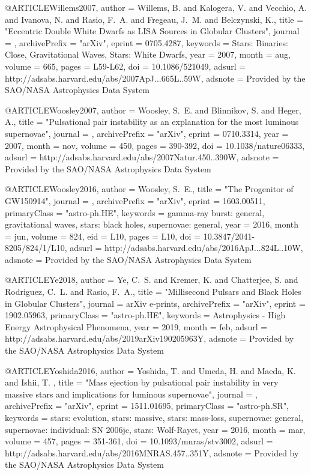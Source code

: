 \documentclass[twocolumn,tighten]{aastex63}
\begin{document}
{{{{{{@ARTICLE{Willems2007,
   author = {{Willems}, B. and {Kalogera}, V. and {Vecchio}, A. and {Ivanova}, N. and 
	{Rasio}, F.~A. and {Fregeau}, J.~M. and {Belczynski}, K.},
    title = "{Eccentric Double White Dwarfs as LISA Sources in Globular Clusters}",
  journal = {\apjl},
archivePrefix = "arXiv",
   eprint = {0705.4287},
 keywords = {Stars: Binaries: Close, Gravitational Waves, Stars: White Dwarfs},
     year = 2007,
    month = aug,
   volume = 665,
    pages = {L59-L62},
      doi = {10.1086/521049},
   adsurl = {http://adsabs.harvard.edu/abs/2007ApJ...665L..59W},
  adsnote = {Provided by the SAO/NASA Astrophysics Data System}
}

@ARTICLE{Woosley2007,
   author = {{Woosley}, S.~E. and {Blinnikov}, S. and {Heger}, A.},
    title = "{Pulsational pair instability as an explanation for the most luminous supernovae}",
  journal = {\nat},
archivePrefix = "arXiv",
   eprint = {0710.3314},
     year = 2007,
    month = nov,
   volume = 450,
    pages = {390-392},
      doi = {10.1038/nature06333},
   adsurl = {http://adsabs.harvard.edu/abs/2007Natur.450..390W},
  adsnote = {Provided by the SAO/NASA Astrophysics Data System}
}

@ARTICLE{Woosley2016,
   author = {{Woosley}, S.~E.},
    title = "{The Progenitor of GW150914}",
  journal = {\apjl},
archivePrefix = "arXiv",
   eprint = {1603.00511},
 primaryClass = "astro-ph.HE",
 keywords = {gamma-ray burst: general, gravitational waves, stars: black holes, supernovae: general},
     year = 2016,
    month = jun,
   volume = 824,
      eid = {L10},
    pages = {L10},
      doi = {10.3847/2041-8205/824/1/L10},
   adsurl = {http://adsabs.harvard.edu/abs/2016ApJ...824L..10W},
  adsnote = {Provided by the SAO/NASA Astrophysics Data System}
}

@ARTICLE{Ye2018,
   author = {{Ye}, C.~S. and {Kremer}, K. and {Chatterjee}, S. and {Rodriguez}, C.~L. and 
	{Rasio}, F.~A.},
    title = "{Millisecond Pulsars and Black Holes in Globular Clusters}",
  journal = {arXiv e-prints},
archivePrefix = "arXiv",
   eprint = {1902.05963},
 primaryClass = "astro-ph.HE",
 keywords = {Astrophysics - High Energy Astrophysical Phenomena},
     year = 2019,
    month = feb,
   adsurl = {http://adsabs.harvard.edu/abs/2019arXiv190205963Y},
  adsnote = {Provided by the SAO/NASA Astrophysics Data System}
}

@ARTICLE{Yoshida2016,
   author = {{Yoshida}, T. and {Umeda}, H. and {Maeda}, K. and {Ishii}, T.
	},
    title = "{Mass ejection by pulsational pair instability in very massive stars and implications for luminous supernovae}",
  journal = {\mnras},
archivePrefix = "arXiv",
   eprint = {1511.01695},
 primaryClass = "astro-ph.SR",
 keywords = {stars: evolution, stars: massive, stars: mass-loss, supernovae: general, supernovae: individual: SN 2006jc, stars: Wolf-Rayet},
     year = 2016,
    month = mar,
   volume = 457,
    pages = {351-361},
      doi = {10.1093/mnras/stv3002},
   adsurl = {http://adsabs.harvard.edu/abs/2016MNRAS.457..351Y},
  adsnote = {Provided by the SAO/NASA Astrophysics Data System}
}

}}}}}}
\end{document}
